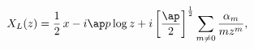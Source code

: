 \begin{equation}
X_L(z)=\frac{1}{2}\,x-i\ap p\log z+i\left[\frac{\ap}{2}\right]^{\frac12}
\sum_{m\ne 0}\frac{\alpha_m}{m z^m},
\label{X_L}
\end{equation}

